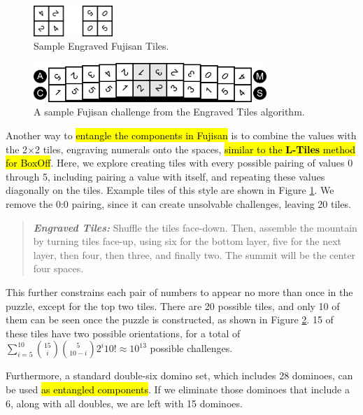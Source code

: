 \documentclass[journal]{IEEEtran}
\begin{document}
\begin{figure}[t]
\centering
\includegraphics[width=3cm]{figure13.png}
\caption{Sample Engraved Fujisan Tiles.}
\label{fig:engravedsample}
\end{figure}


\begin{figure}[b]
\includegraphics[width=8.8cm]{figure14.png}
\caption{A sample Fujisan challenge from the Engraved Tiles algorithm.}
\label{fig:tileexample}
\end{figure}



Another way to \hl{entangle the components in Fujisan} is to combine the values with the 2$\times$2 tiles, engraving numerals onto the spaces, \hl{similar to the \textbf{L-Tiles} method for BoxOff}. Here, we explore creating tiles with every possible pairing of values 0 through 5, including pairing a value with itself, and repeating these values diagonally on the tiles. Example tiles of this style are shown in Figure \ref{fig:engravedsample}. We remove the 0:0 pairing, since it can create unsolvable challenges, leaving 20 tiles.

\begin{quote}
    
  {\it \bf Engraved Tiles:} Shuffle the tiles face-down. Then, assemble the mountain by turning tiles face-up, using six for the bottom layer, five for the next layer, then four, then three, and finally two. The summit will be the center four spaces.
\end{quote}

This further constrains each pair of numbers to appear no more than once in the puzzle, except for the top two tiles. There are 20 possible tiles, and only 10 of them can be seen once the puzzle is constructed, as shown in Figure \ref{fig:tileexample}. 15 of these tiles have two possible orientations, for a total of $\sum_{i = 5}^{10}{15 \choose i}\binom{5}{10 - i}2^{i}10! \approx 10^{13}
$ possible challenges.

Furthermore, a standard double-six domino set, which includes 28 dominoes, 
can be used \hl{as entangled components}. If we eliminate those dominoes that include a 6, along with all doubles, we are left with 15 dominoes. 
\end{document}
